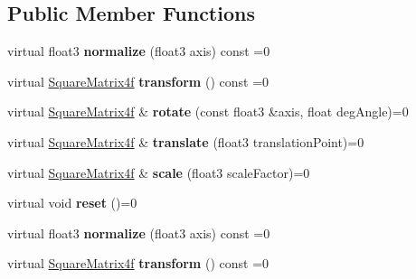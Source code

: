\subsection*{Public Member Functions}
\begin{DoxyCompactItemize}
\item 
virtual float3 {\bfseries normalize} (float3 axis) const =0\hypertarget{class_pipeline_a45a5dd1398482de5c9fd57ada431229d}{}\label{class_pipeline_a45a5dd1398482de5c9fd57ada431229d}

\item 
virtual \hyperlink{class_square_matrix4}{Square\+Matrix4f} {\bfseries transform} () const =0\hypertarget{class_pipeline_a8d5faa6d841fb9e6cc2527d904ad6bee}{}\label{class_pipeline_a8d5faa6d841fb9e6cc2527d904ad6bee}

\item 
virtual \hyperlink{class_square_matrix4}{Square\+Matrix4f} \& {\bfseries rotate} (const float3 \&axis, float deg\+Angle)=0\hypertarget{class_pipeline_a2b50d058b74ce266e58acd4ab1622ef9}{}\label{class_pipeline_a2b50d058b74ce266e58acd4ab1622ef9}

\item 
virtual \hyperlink{class_square_matrix4}{Square\+Matrix4f} \& {\bfseries translate} (float3 translation\+Point)=0\hypertarget{class_pipeline_a7c12b9fa044a6341e08d5639c9ee7db4}{}\label{class_pipeline_a7c12b9fa044a6341e08d5639c9ee7db4}

\item 
virtual \hyperlink{class_square_matrix4}{Square\+Matrix4f} \& {\bfseries scale} (float3 scale\+Factor)=0\hypertarget{class_pipeline_a60ed7a51148b346075ad5aa23c766d30}{}\label{class_pipeline_a60ed7a51148b346075ad5aa23c766d30}

\item 
virtual void {\bfseries reset} ()=0\hypertarget{class_pipeline_a632192d4703d48e1e7fec206c6dcddf7}{}\label{class_pipeline_a632192d4703d48e1e7fec206c6dcddf7}

\item 
virtual float3 {\bfseries normalize} (float3 axis) const =0\hypertarget{class_pipeline_a45a5dd1398482de5c9fd57ada431229d}{}\label{class_pipeline_a45a5dd1398482de5c9fd57ada431229d}

\item 
virtual \hyperlink{class_square_matrix4}{Square\+Matrix4f} {\bfseries transform} () const =0\hypertarget{class_pipeline_a8d5faa6d841fb9e6cc2527d904ad6bee}{}\label{class_pipeline_a8d5faa6d841fb9e6cc2527d904ad6bee}


\end{DoxyCompactItemize}
